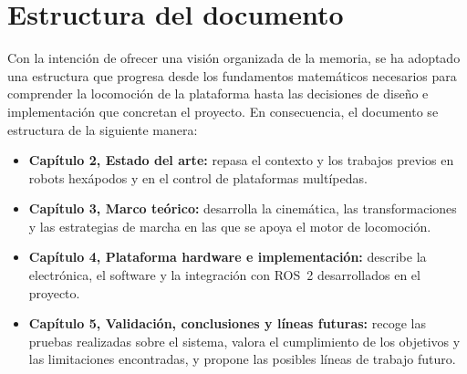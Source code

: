 \section{Estructura del documento} \label{sec:estructura_memoria}

Con la intención de ofrecer una visión organizada de la memoria, se ha adoptado una estructura que progresa desde los fundamentos matemáticos necesarios para comprender la locomoción de la plataforma hasta las decisiones de diseño e implementación que concretan el proyecto. En consecuencia, el documento se estructura de la siguiente manera:

\begin{itemize}
    \item \textbf{Capítulo 2, Estado del arte:} repasa el contexto y los trabajos previos en robots hexápodos y en el control de plataformas multípedas.

    \item \textbf{Capítulo 3, Marco teórico:} desarrolla la cinemática, las transformaciones y las estrategias de marcha en las que se apoya el motor de locomoción.

    \item \textbf{Capítulo 4, Plataforma hardware e implementación:} describe la electrónica, el software y la integración con ROS~2 desarrollados en el proyecto.

    \item \textbf{Capítulo 5, Validación, conclusiones y líneas futuras:} recoge las pruebas realizadas sobre el sistema, valora el cumplimiento de los objetivos y las limitaciones encontradas, y propone las posibles líneas de trabajo futuro.
\end{itemize}
